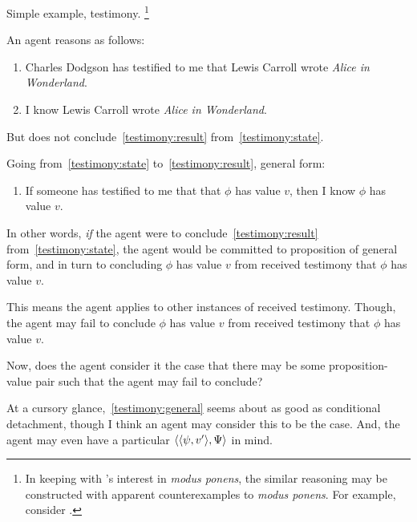 \begin{note}
  Simple example, testimony.%
  \footnote{
    In keeping with \citeauthor{Carroll:1895uj}'s interest in \emph{modus ponens}, the similar reasoning may be constructed with apparent counterexamples to \emph{modus ponens}.
    For example, consider \textcite{McGee:1985tz}.
  }

  \begin{illustration}
    An agent reasons as follows:
    \begin{enumerate}[label=\arabic*., ref=(\arabic*)]
    \item
      \label{testimony:state}
      Charles Dodgson has testified to me that Lewis Carroll wrote \emph{Alice in Wonderland}.
    \item
      \label{testimony:result}
      I know Lewis Carroll wrote \emph{Alice in Wonderland}.
    \end{enumerate}
    But does not conclude~\ref{testimony:result} from~\ref{testimony:state}.
  \end{illustration}

  Going from~\ref{testimony:state} to~\ref{testimony:result}, general form:

  \begin{enumerate}[label=\(\gamma\)., ref=(\(\gamma\))]
  \item
    \label{testimony:general}
    If someone has testified to me that that \(\phi\) has value \(v\), then I know \(\phi\) has value \(v\).
  \end{enumerate}

  In other words, \emph{if} the agent were to conclude~\ref{testimony:result} from~\ref{testimony:state}, the agent would be committed to proposition of general form, and in turn to concluding \(\phi\) has value \(v\) from received testimony that \(\phi\) has value \(v\).

  This means the agent applies to other instances of received testimony.
  Though, the agent may fail to conclude \(\phi\) has value \(v\) from received testimony that \(\phi\) has value \(v\).

  Now, does the agent consider it the case that there may be some proposition-value pair such that the agent may fail to conclude?

  At a cursory glance,~\ref{testimony:general} seems about as good as conditional detachment, though I think an agent may consider this to be the case.
  And, the agent may even have a particular \(\langle \langle \psi, v' \rangle, \Psi \rangle\) in mind.


\end{note}
